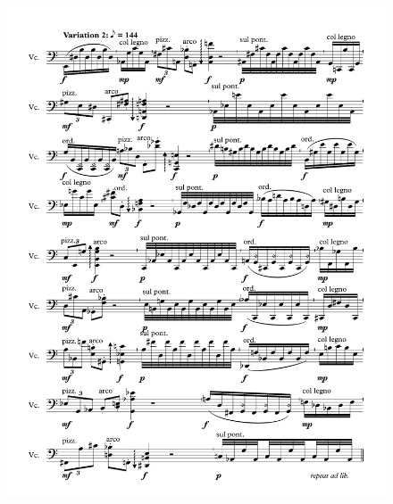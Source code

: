 \begin{figure}[htbp]
    \centering
	\includegraphics[width=6.5in]{figures/Variations_2.pdf}
\end{figure}

